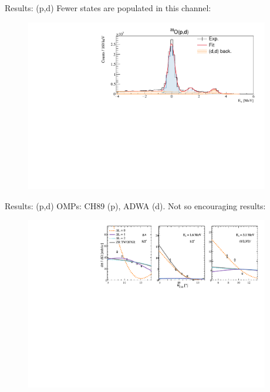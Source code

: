 \documentclass[aspectratio=43, dvipsnames]{beamer}
\newcommand{\iso}[2]{\ce{^{#1}#2}}
\begin{document}
\begin{frame}{Results: \iso{20}{O}(p,d)}
	Fewer states are populated in this channel:
	\begin{figure}
		\includegraphics[width=0.95\textwidth]{figures/pd_xs.pdf}
	\end{figure}

\end{frame}

\begin{frame}{Results: \iso{20}{O}(p,d)}
	OMPs: CH89 (p), ADWA (d). Not so encouraging results:
	\begin{figure}
		\includegraphics[width=0.95\textwidth]{figures/pd_ang_0.pdf}
	\end{figure}
	\begin{columns}[c]
		\begin{column}{0.5\linewidth}
		\end{column}%
		\begin{column}{0.5\linewidth}
		\end{column}
	\end{columns}
\end{frame}
\end{document}
